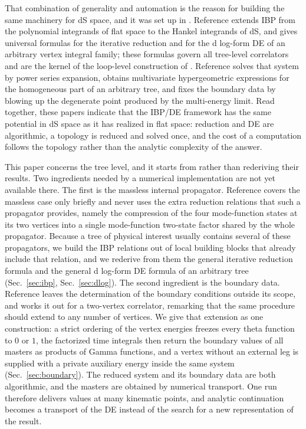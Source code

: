 \documentclass[11pt,a4paper]{article}
\begin{document}
That combination of generality and automation is the reason for building the same machinery for dS space, and
it was set up in \cite{Chen:2023iix,Chen:2024glu,Chen:2026dqp}. Reference \cite{Chen:2023iix} extends IBP
from the polynomial integrands of flat space to the Hankel integrands of dS, and gives universal formulas
for the iterative reduction and for the d log-form DE of an arbitrary vertex integral family; these
formulas govern all tree-level correlators and are the kernel of the loop-level construction of
\cite{Chen:2026dqp}. Reference \cite{Chen:2024glu} solves that system by power series expansion, obtains
multivariate hypergeometric expressions for the homogeneous part of an arbitrary tree, and fixes the
boundary data by blowing up the degenerate point produced by the multi-energy limit. Read together, these
papers indicate that the IBP/DE framework has the same potential in dS space as it has realized in flat
space: reduction and DE are algorithmic, a topology is reduced and solved once, and the cost of a
computation follows the topology rather than the analytic complexity of the answer.

This paper concerns the tree level, and it starts from \cite{Chen:2023iix,Chen:2024glu} rather than
rederiving their results. Two ingredients needed by a numerical implementation are not yet available there.
The first is the massless internal propagator. Reference \cite{Chen:2023iix} covers the massless case only
briefly and
never uses the extra reduction relations that such a propagator provides, namely the compression of the
four mode-function states at its two vertices into a single mode-function two-state factor shared by the whole propagator. Because a
tree of physical interest usually contains several of these propagators, we build the IBP relations out of
local building blocks that already include that relation, and we rederive from them the
general iterative reduction formula and the general d log-form DE formula of an arbitrary tree
(Sec.~\ref{sec:ibp}, Sec.~\ref{sec:dlog}). The second ingredient is the boundary data. Reference
\cite{Chen:2023iix} leaves the determination of the boundary conditions outside its scope, and
\cite{Chen:2024glu} works it out for a
two-vertex correlator, remarking that the same procedure should extend to any number of vertices. We give that
extension as one construction: a strict ordering of the vertex energies freezes every theta function to
$0$ or $1$, the factorized time integrals then return the boundary values of all masters as products of
Gamma functions, and a vertex without an external leg is supplied with a private auxiliary energy inside
the same system (Sec.~\ref{sec:boundary}). The reduced system and its boundary data are both algorithmic,
and the masters are obtained by numerical transport. One run therefore delivers values at many kinematic
points, and analytic continuation becomes a transport of the DE instead of the search for a new
representation of the result.
\end{document}
